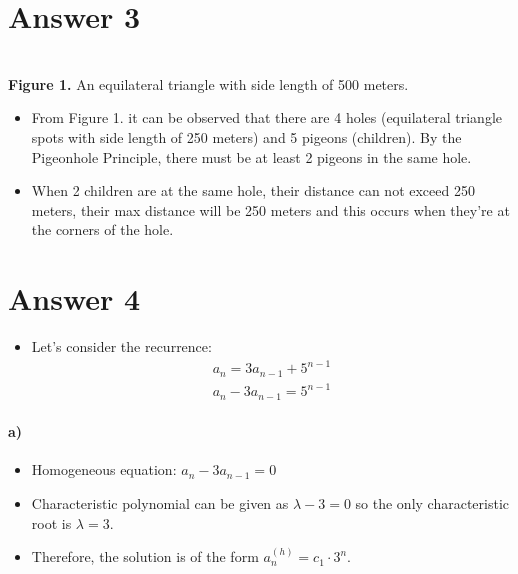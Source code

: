 \documentclass[12pt]{article}
\begin{document}
\section*{Answer 3}
\begin{center}
    \\ \textbf{Figure 1.} An equilateral triangle with side length of 500 meters.
    \end{center}
    \begin{itemize}   
     \item From Figure 1. it can be observed that there are 4 holes (equilateral triangle spots with side length of 250 meters) and 5 pigeons (children). By the Pigeonhole Principle, there must be at least 2 pigeons in the same hole.
     \item When 2 children are at the same hole, their distance can not exceed 250 meters, their max distance will be 250 meters and this occurs when they're at the corners of the hole.
    \end{itemize}
\section*{Answer 4}
\begin{itemize}
    \item Let's consider the recurrence:
    \begin{equation*}
        \begin{split}
            a_n = 3a_{n-1} + 5^{n-1}\\
            a_n - 3a_{n-1} = 5^{n-1}
        \end{split}
    \end{equation*}
\end{itemize}
\paragraph*{a)}
\begin{itemize}
    \item Homogeneous equation: $a_n - 3a_{n-1} = 0$
    \item Characteristic polynomial can be given as $\lambda - 3 = 0$ so the only characteristic root is $\lambda = 3$.
    \item Therefore, the solution is of the form $a_n^{(h)} = c_1\cdot3^n$.
\end{itemize}
\end{document}
